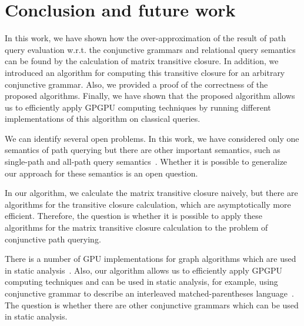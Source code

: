 \section{Conclusion and future work} \label{section_conclusion}
In this work, we have shown how the over-approximation of the result of path query evaluation w.r.t. the conjunctive grammars and relational query semantics can be found by the calculation of matrix transitive closure. In addition, we introduced an algorithm for computing this transitive closure for an arbitrary conjunctive grammar. Also, we provided a proof of the correctness of the proposed algorithms. Finally, we have shown that the proposed algorithm allows us to efficiently apply GPGPU computing techniques by running different implementations of this algorithm on classical queries. 

We can identify several open problems. In this work, we have considered only one semantics of path querying but there are other important semantics, such as single-path and all-path query semantics~\cite{hellingsPathQuerying}. Whether it is possible to generalize our approach for these semantics is an open question.

In our algorithm, we calculate the matrix transitive closure naively, but there are algorithms for the transitive closure calculation, which are asymptotically more efficient. Therefore, the question is whether it is possible to apply these algorithms for the matrix transitive closure calculation to the problem of conjunctive path querying.

There is a number of GPU implementations for graph algorithms which are used in static analysis~\cite{mendez2012gpu,su2013accelerating,su2016efficient}. Also, our algorithm  allows us to efficiently apply GPGPU computing techniques and can be used in static analysis, for example, using conjunctive grammar to describe an interleaved matched-parentheses language~\cite{zhang2017context}. The question is whether there are other conjunctive grammars which can be used in static analysis.
